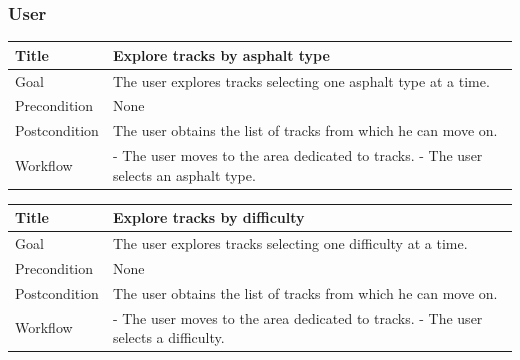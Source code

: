 \documentclass{beamer}
\begin{document}
\begin{frame}
    \frametitle{User}
    \begin{table}
        \tiny
        \begin{tabular}{|p{2cm}|p{6cm}|}
        \hline
        Title & \textbf{Explore tracks by asphalt type} \\
        \hline
        Goal & The user explores tracks selecting one asphalt type at a time. \\
        \hline
        Precondition & None \\
        \hline
        Postcondition & The user obtains the list of tracks from which he can move on.\\
        \hline
        Workflow &
        - The user moves to the area dedicated to tracks. \newline
        - The user selects an asphalt type. \\
        \hline
        \end{tabular}
\end{table}

\begin{table}
    \tiny
    \begin{tabular}{|p{2cm}|p{6cm}|}
    \hline
    Title & \textbf{Explore tracks by difficulty} \\
    \hline
    Goal & The user explores tracks selecting one difficulty at a time. \\
    \hline
    Precondition & None \\
    \hline
    Postcondition & The user obtains the list of tracks from which he can move on.\\
    \hline
    Workflow &
    - The user moves to the area dedicated to tracks. \newline
    - The user selects a difficulty. \\
    \hline
    \end{tabular}
\end{table}
\end{frame}


\end{document}
